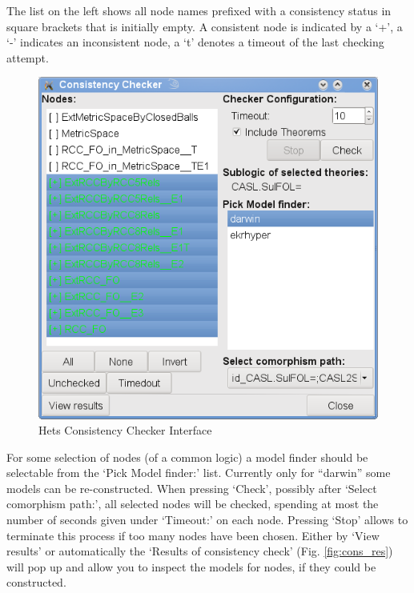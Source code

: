 \documentclass{article}
\begin{document}
The list on the left shows all node names prefixed with a consistency status
in square brackets that is initially empty.  A consistent node is indicated by
a `+', a `-' indicates an inconsistent node, a `t' denotes a timeout of the last
checking attempt.

\begin{figure}
\centering
\includegraphics[width=\textwidth]{ConsistencyChecker}
\caption{Hets Consistency Checker Interface\label{fig:cons_window}}
\end{figure}

For some selection of nodes (of a common logic) a model finder should be
selectable from the `Pick Model finder:' list. Currently only for ``darwin''
some \CASL models can be re-constructed. When pressing `Check', possibly after
`Select comorphism path:', all selected nodes will be checked, spending at
most the number of seconds given under `Timeout:' on each node. Pressing
`Stop' allows to terminate this process if too many nodes have been chosen.
Either by `View results' or automatically the `Results of consistency check'
(Fig. \ref{fig:cons_res}) will pop up and allow you to inspect the models for
nodes, if they could be constructed.
\end{document}
